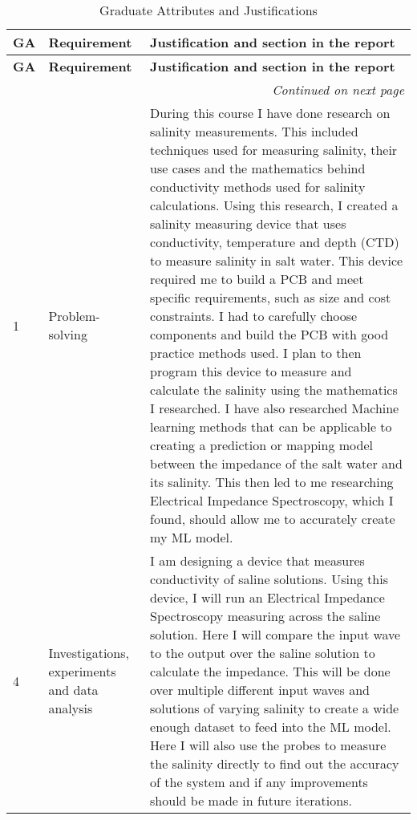 \begin{center}
\setlength{\extrarowheight}{1em} %
\begin{longtable}{||p{2em}|p{15em}|p{20em}||}
\caption{Graduate Attributes and Justifications}\label{tab:GA_requirements} \\
\hline
\textbf{GA} & \textbf{Requirement} & \textbf{Justification and section in the report} \\ [0.5ex]
\hline
\endfirsthead

\hline
\textbf{GA} & \textbf{Requirement} & \textbf{Justification and section in the report} \\ [0.5ex]
\hline
\endhead

\hline
\multicolumn{3}{r}{\textit{Continued on next page}} \\
\hline
\endfoot

\hline
\endlastfoot

1 & Problem-solving &
During this course I have done research on salinity measurements. This included techniques used for measuring salinity, their use cases and the mathematics behind conductivity methods used for salinity calculations. Using this research, I created a salinity measuring device that uses conductivity, temperature and depth (CTD) to measure salinity in salt water. This device required me to build a PCB and meet specific requirements, such as size and cost constraints. I had to carefully choose components and build the PCB with good practice methods used. I plan to then program this device to measure and calculate the salinity using the mathematics I researched. I have also researched Machine learning methods that can be applicable to creating a prediction or mapping model between the impedance of the salt water and its salinity. This then led to me researching Electrical Impedance Spectroscopy, which I found, should allow me to accurately create my ML model. \\ \hline

4 & Investigations, experiments and data analysis &
I am designing a device that measures conductivity of saline solutions. Using this device, I will run an Electrical Impedance Spectroscopy measuring across the saline solution. Here I will compare the input wave to the output over the saline solution to calculate the impedance. This will be done over multiple different input waves and solutions of varying salinity to create a wide enough dataset to feed into the ML model. Here I will also use the probes to measure the salinity directly to find out the accuracy of the system and if any improvements should be made in future iterations. \\ \hline


\end{longtable}
\end{center}
